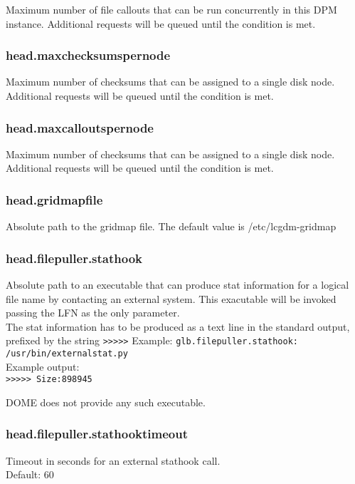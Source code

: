 \documentclass[a4paper,10pt]{scrreprt}
\begin{document}
Maximum number of file callouts that can be run concurrently in this DPM instance. Additional requests will be queued until the condition is met.\\

\subsubsection{head.maxchecksumspernode}

Maximum number of checksums that can be assigned to a single disk node. Additional requests will be queued until the condition is met.\\

\subsubsection{head.maxcalloutspernode}

Maximum number of checksums that can be assigned to a single disk node. Additional requests will be queued until the condition is met.\\


\subsubsection{head.gridmapfile}

Absolute path to the gridmap file. The default value is /etc/lcgdm-gridmap

\subsubsection{head.filepuller.stathook}

Absolute path to an executable that can produce stat information for a logical file name by contacting an external system. This exacutable
will be invoked passing the LFN as the only parameter.\\
The stat information has to be produced as a text line in the standard output, prefixed by the string \lstinline">>>>>"
Example:
\lstinline"glb.filepuller.stathook: /usr/bin/externalstat.py"\\
Example output:\\
\lstinline">>>>> Size:898945"

DOME does not provide any such executable.\\

\subsubsection{head.filepuller.stathooktimeout}
Timeout in seconds for an external stathook call.\\
Default: 60\\
\end{document}
